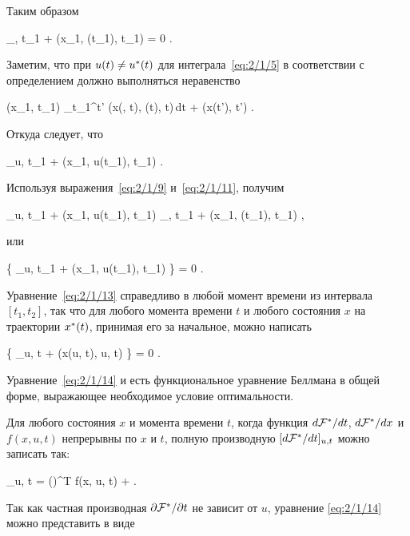 Таким образом

    _{\optU, t_1} + \funcL\bigl(x_1, \optU(t_1), t_1\bigr) = 0 \mbox{.}
\eeq

Заметим, что при $u(t) \neq u^{*}(t)$ для интеграла~\ref{eq:2/1/5} в соответствии с определением должно выполняться неравенство

    \optF(x_1, t_1) \leqslant \int\limits_{t_1}^{t'} \funcL\bigl(x(\optU, t), \optU(t), t\bigr)\,dt + \optF\bigl(x(t'), t'\bigr) \mbox{.}
\eeq

Откуда следует, что

    _{u, t_1} + \funcL\bigl(x_1, u(t_1), t_1\bigr)  \mbox{.}
\eeq

Используя выражения~\vref{eq:2/1/9} и~\ref{eq:2/1/11}, получим

    _{u, t_1} + \funcL\bigl(x_1, u(t_1), t_1\bigr) \geqslant {}_{\optU, t_1} + \funcL\bigl(x_1, \optU(t_1), t_1\bigr) \mbox{,}
\eeq

или

     \biggl\{ _{u, t_1} + \funcL\bigl(x_1, u(t_1), t_1\bigr) \biggr\} = 0 \mbox{.}
\eeq

Уравнение~\ref{eq:2/1/13} справедливо в любой момент времени из интервала $[t_1, t_2]$, так что для любого момента времени $t$ и любого состояния $x$ на траектории $x^{*}(t)$, принимая его за начальное, можно написать

     \biggl\{ _{u, t} + \funcL\bigl(x(u, t), u, t\bigr) \biggr\} = 0 \mbox{.}
\eeq

Уравнение~\ref{eq:2/1/14} и есть функциональное уравнение Беллмана в общей форме, выражающее необходимое условие оптимальности.

Для любого состояния $x$ и момента времени $t$, когда функция $d \mathcal{F}^{*} / d t$, $d \mathcal{F}^{*} / d x$ и $f(x, u, t)$ непрерывны по $x$ и $t$, полную производную $[d \mathcal{F}^{*} / d t]_{u, t}$ можно записать так:

    _{u, t} = \biggl(\biggr)^T f(x, u, t) +  \mbox{.}
\eeq

Так как частная производная $\partial {    \mathcal{F}  ^{*}  } / \partial {t}$ не зависит от $u$, уравнение \ref{eq:2/1/14} можно представить в виде

